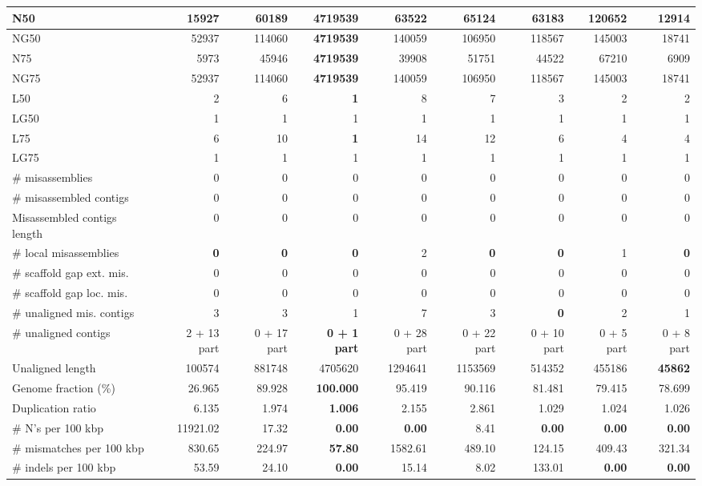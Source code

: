 \documentclass[12pt,a4paper]{article}
\begin{document}
\begin{table}[ht]
\begin{center}
\begin{tabular}{|l*{8}{|r}|}
N50 & 15927 & 60189 & {\bf 4719539} & 63522 & 65124 & 63183 & 120652 & 12914 \\ \hline
NG50 & 52937 & 114060 & {\bf 4719539} & 140059 & 106950 & 118567 & 145003 & 18741 \\ \hline
N75 & 5973 & 45946 & {\bf 4719539} & 39908 & 51751 & 44522 & 67210 & 6909 \\ \hline
NG75 & 52937 & 114060 & {\bf 4719539} & 140059 & 106950 & 118567 & 145003 & 18741 \\ \hline
L50 & 2 & 6 & {\bf 1} & 8 & 7 & 3 & 2 & 2 \\ \hline
LG50 & 1 & 1 & 1 & 1 & 1 & 1 & 1 & 1 \\ \hline
L75 & 6 & 10 & {\bf 1} & 14 & 12 & 6 & 4 & 4 \\ \hline
LG75 & 1 & 1 & 1 & 1 & 1 & 1 & 1 & 1 \\ \hline
\# misassemblies & 0 & 0 & 0 & 0 & 0 & 0 & 0 & 0 \\ \hline
\# misassembled contigs & 0 & 0 & 0 & 0 & 0 & 0 & 0 & 0 \\ \hline
Misassembled contigs length & 0 & 0 & 0 & 0 & 0 & 0 & 0 & 0 \\ \hline
\# local misassemblies & {\bf 0} & {\bf 0} & {\bf 0} & 2 & {\bf 0} & {\bf 0} & 1 & {\bf 0} \\ \hline
\# scaffold gap ext. mis. & 0 & 0 & 0 & 0 & 0 & 0 & 0 & 0 \\ \hline
\# scaffold gap loc. mis. & 0 & 0 & 0 & 0 & 0 & 0 & 0 & 0 \\ \hline
\# unaligned mis. contigs & 3 & 3 & 1 & 7 & 3 & {\bf 0} & 2 & 1 \\ \hline
\# unaligned contigs & 2 + 13 part & 0 + 17 part & {\bf 0 + 1 part} & 0 + 28 part & 0 + 22 part & 0 + 10 part & 0 + 5 part & 0 + 8 part \\ \hline
Unaligned length & 100574 & 881748 & 4705620 & 1294641 & 1153569 & 514352 & 455186 & {\bf 45862} \\ \hline
Genome fraction (\%) & 26.965 & 89.928 & {\bf 100.000} & 95.419 & 90.116 & 81.481 & 79.415 & 78.699 \\ \hline
Duplication ratio & 6.135 & 1.974 & {\bf 1.006} & 2.155 & 2.861 & 1.029 & 1.024 & 1.026 \\ \hline
\# N's per 100 kbp & 11921.02 & 17.32 & {\bf 0.00} & {\bf 0.00} & 8.41 & {\bf 0.00} & {\bf 0.00} & {\bf 0.00} \\ \hline
\# mismatches per 100 kbp & 830.65 & 224.97 & {\bf 57.80} & 1582.61 & 489.10 & 124.15 & 409.43 & 321.34 \\ \hline
\# indels per 100 kbp & 53.59 & 24.10 & {\bf 0.00} & 15.14 & 8.02 & 133.01 & {\bf 0.00} & {\bf 0.00} \\ \hline

\end{tabular}
\end{center}
\end{table}
\end{document}
